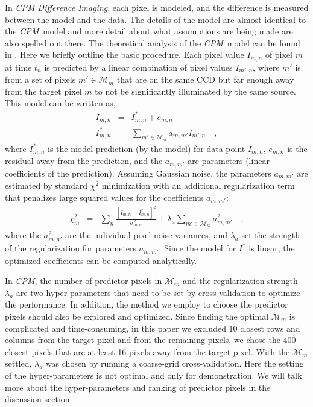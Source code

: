 \documentclass[12pt, preprint]{aastex}
\newcommand{\project}[1]{\textsl{#1}}
\newcommand{\cpm}{\project{CPM}}
\newcommand{\cpmdiff}{\project{CPM Difference Imaging}}
\newcommand{\set}[1]{\mathcal{#1}}
\begin{document}
In \cpmdiff, each pixel is modeled, and the difference is measured between the model and the data. 
The details of the model are almost identical to the \cpm\ model \citep{cpm} and more detail about what assumptions are being made are also spelled out there. 
The theoretical analysis of the \cpm\ model can be found in \cite{pnas}.
Here we briefly outline the basic procedure. 
Each pixel value $I_{m,n}$ of pixel $m$ at time $t_n$ is predicted by a linear combination of pixel values $I_{m',n}$, where $m'$ is from a set of pixels $m'\in\set{M}_m$ that are on the same CCD but far enough away from the target pixel $m$ to not be significantly illuminated by the same source. 
This model can be written as,
\begin{eqnarray}
I_{m,n}         &=& I^{\ast}_{m,n} + e_{m,n}
\\
I^{\ast}_{m,n}  &=& \sum_{m'\in\set{M}_m} a_{m,m'}I_{m',n} 
\quad,
\end{eqnarray}
where $I^{\ast}_{m,n}$ is the model prediction (by the model) for data point $I_{m,n}$, $e_{m,n}$ is the residual away from the prediction, and the $a_{m,m'}$ are parameters (linear coefficients of the prediction).
Assuming Gaussian noise, the parameters $a_{m,m'}$ are estimated by standard $\chi^2$ minimization with an additional regularization term that penalizes large squared values for the coefficients $a_{m,m'}$:
\begin{eqnarray}
\chi^2_{m}    &=& \sum_{n} \frac{[I_{m,n} - I^{\ast}_{m,n}]^2}{\sigma^2_{m,n}}+ \lambda_{a}\sum_{m'\in\set{M}_m}a_{m,m'}^2 
\quad,
\end{eqnarray}
where the $\sigma^2_{m,n'}$ are the individual-pixel noise variances, and $\lambda_{a}$ set the strength of the regularization for parameters $a_{m,m'}$.
Since the model for $I^{\ast}$ is linear, the optimized coefficients can be computed analytically.

In \cpm, the number of predictor pixels in $\set{M}_m$ and the regularization strength $\lambda_{a}$ are two hyper-parameters that need to be set by cross-validation to optimize the performance. 
In addition, the method we employ to choose the predictor pixels should also be explored and optimized.
Since finding the optimal $\set{M}_m$ is complicated and time-consuming, in this paper we excluded 10 closest rows and columns from the target pixel and from the remaining pixels, we chose the 400 closest pixels that are at least 16 pixels away from the target pixel.
With the $\set{M}_m$ settled, $\lambda_{a}$ was chosen by running a coarse-grid cross-validation. 
Here the setting of the hyper-parameters is not optimal and only for demonstration. 
We will talk more about the hyper-parameters and ranking of predictor pixels in the discussion section.
\end{document}
